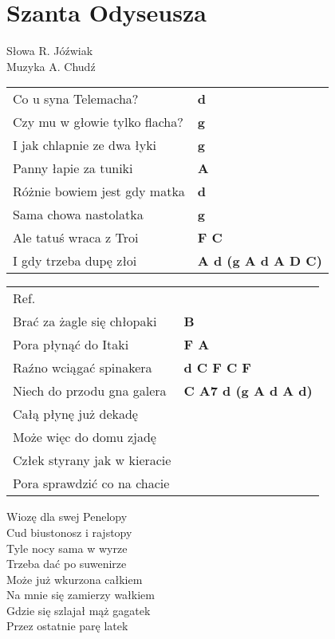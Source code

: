 \section{Szanta Odyseusza}

Słowa R. Jóźwiak\\
Muzyka A. Chudź

\vspace{2em}
\begin{tabular}{@{}p{8cm}@{}l@{}}
Co u syna Telemacha? & \bfseries  d \\
Czy mu w głowie tylko flacha? & \bfseries  g \\
I jak chlapnie ze dwa łyki & \bfseries  g \\
Panny łapie za tuniki & \bfseries  A \\
Różnie bowiem jest gdy matka & \bfseries  d \\
Sama chowa nastolatka & \bfseries  g \\
Ale tatuś wraca z Troi & \bfseries  F C \\
I gdy trzeba dupę złoi & \bfseries  A d (g A d A D C) \\
\end{tabular}

\vspace{1em}
\begin{tabular}{@{}p{8cm}@{}l@{}}
Ref. \\
Brać za żagle się chłopaki & \bfseries  B \\
Pora płynąć do Itaki & \bfseries  F A \\
Raźno wciągać spinakera & \bfseries  d C F C F \\
Niech do przodu gna galera & \bfseries  C A7 d (g A d A d) \\
Całą płynę już dekadę \\
Może więc do domu zjadę  \\
Człek styrany jak w kieracie  \\
Pora sprawdzić co na chacie  \\
\end{tabular}
\vspace{1em}

Wiozę dla swej Penelopy \\
Cud biustonosz i rajstopy \\
Tyle nocy sama w wyrze \\
Trzeba dać po suwenirze \\
Może już wkurzona całkiem \\
Na mnie się zamierzy wałkiem \\
Gdzie się szlajał mąż gagatek \\
Przez ostatnie parę latek \\
\newpage

